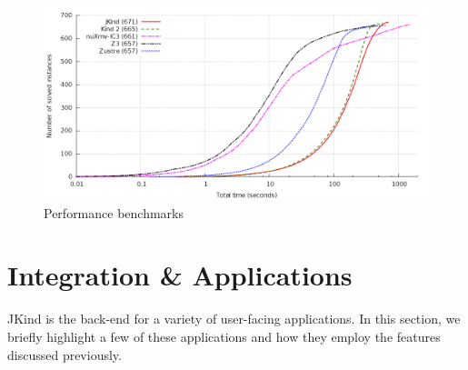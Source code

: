 \documentclass{llncs}
\newcommand{\jkind}{{\sc JKind}\xspace}
\newcommand{\jkindapi}{{\sc JKindApi}\xspace}
\newcommand{\lustre}{{\sc Lustre}\xspace}
\newcommand{\mike}[1]{\textcolor{red}{#1}}
\begin{document}
\begin{figure}[t]
  \begin{center}
    \includegraphics[width=\textwidth]{graph.png}
  \end{center}
  \vspace{-2em}
  \caption{Performance benchmarks}
  \vspace{-1em}
  \label{fig:benchmark}
\end{figure}


\section{Integration \& Applications}


\jkind is the back-end for a variety of user-facing applications. In this section, we briefly highlight a few of these applications and how they employ the features discussed previously.
%
%
\end{document}
